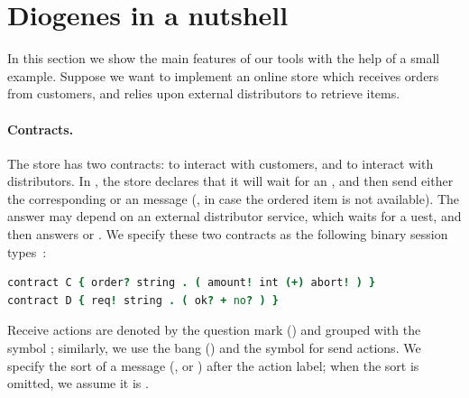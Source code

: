 \section{Diogenes in a nutshell}

In this section we show the main features of our tools
with the help of a small example.
Suppose we want to implement an online store which 
receives orders from customers,
and relies upon external distributors to retrieve items.

\paragraph{Contracts.}
The store has two contracts:
 to interact with customers, and
 to interact with distributors.
In , the store declares that it will wait for an ,
and then send either the corresponding  or an  message
(\eg, in case the ordered item is not available).
%
The answer may depend on an external distributor service, 
which waits for a uest, and then answers  or .
% 
We specify these two contracts as the following 
binary session types~\cite{Honda98esop}:
% 
\begin{lstlisting}[language=coco,basicstyle=\scriptsize\ttfamily]
contract C { order? string . ( amount! int (+) abort! ) }
contract D { req! string . ( ok? + no? ) }
\end{lstlisting}
Receive actions are denoted by the question mark () and grouped
with the symbol \code{+}; similarly, we use the
bang (\code{!}) and the symbol \code{(+)} for send actions. 
We specify the sort of a message 
(,  or )
after the action label;
when the sort is omitted, we assume it is .


